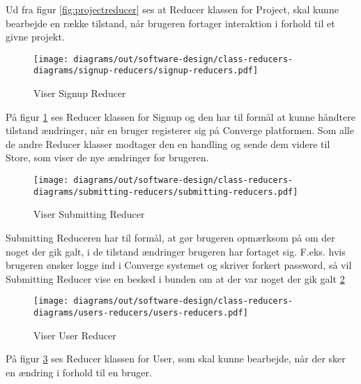 Ud fra figur \ref{fig:projectreducer} ses at Reducer klassen for Project, skal kunne bearbejde en række tilstand, når brugeren fortager interaktion i forhold til et givne projekt. 

\begin{figure}[H]
    \centering
\texttt{[image: diagrams/out/software-design/class-reducers-diagrams/signup-reducers/signup-reducers.pdf]}
\caption{Viser Signup Reducer}
\label{fig:signup}
\end{figure}

På figur \ref{fig:signup} ses Reducer klassen for Signup og den har til formål at kunne håndtere tilstand ændringer, når en bruger registerer sig på Converge platformen. Som alle de andre Reducer klasser modtager den en handling og sende dem videre til Store, som viser de nye ændringer for brugeren.

\begin{figure}[H]
    \centering
\texttt{[image: diagrams/out/software-design/class-reducers-diagrams/submitting-reducers/submitting-reducers.pdf]}
\caption{Viser Submitting Reducer}
\label{fig:submitting}
\end{figure}

Submitting Reduceren har til formål, at gør brugeren opmærksom på om der noget der gik galt, i de tilstand ændringer brugeren har fortaget sig. F.eks. hvis brugeren ønsker logge ind i Converge systemet og skriver forkert password, så vil Submitting Reducer vise en besked i bunden om at der var noget der gik galt \ref{fig:submitting}
 
\begin{figure}[H]
    \centering
\texttt{[image: diagrams/out/software-design/class-reducers-diagrams/users-reducers/users-reducers.pdf]}
\caption{Viser User Reducer}
\label{fig:userreducer}
\end{figure}

På figur \ref{fig:userreducer} ses Reducer klassen for User, som skal kunne bearbejde, når der sker en ændring i forhold til en bruger. 